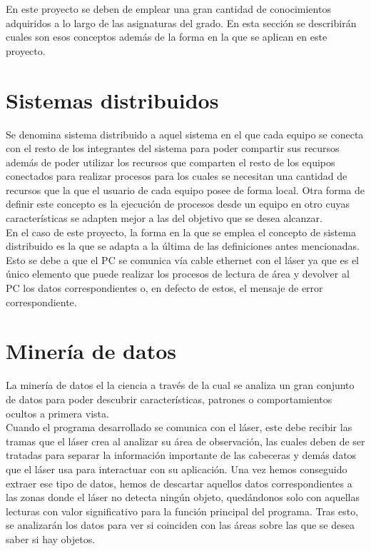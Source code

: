 
En este proyecto se deben de emplear una gran cantidad de  conocimientos adquiridos a lo largo de las asignaturas del grado. En esta sección se describirán cuales son esos conceptos además de la forma en la que se aplican en este proyecto.

\section{Sistemas distribuidos}

Se denomina sistema distribuido a aquel sistema en el que cada equipo se conecta con el resto de los integrantes del sistema para poder compartir sus recursos además de poder utilizar los recursos que comparten el resto de los equipos conectados para realizar procesos para los cuales se necesitan una cantidad de recursos que la que el usuario de cada equipo posee de forma local. Otra forma de definir este concepto es la ejecución de procesos desde un equipo en otro cuyas características se adapten mejor a las del objetivo que se desea alcanzar.\\
En el caso de este proyecto, la forma en la que se emplea el concepto de sistema distribuido es la que se adapta a la última de las definiciones antes mencionadas. Esto se debe a que el PC se comunica vía cable ethernet con el láser ya que es el único elemento que puede realizar los procesos de lectura de área y devolver al PC los datos correspondientes o, en defecto de estos, el mensaje de error correspondiente.

\section{Minería de datos}

La minería de datos el la ciencia a través de la cual se analiza un gran conjunto de datos para poder descubrir características, patrones o comportamientos ocultos a primera vista.\\
Cuando el programa desarrollado se comunica con el láser, este debe recibir las tramas que el láser crea al analizar su área de observación, las cuales deben de ser tratadas para separar la información importante de las cabeceras y demás datos que el láser usa para interactuar con su aplicación. Una vez hemos conseguido extraer ese tipo de datos, hemos de descartar aquellos datos correspondientes a las zonas donde el láser no detecta ningún objeto, quedándonos solo con aquellas lecturas con valor significativo para la función principal del programa. Tras esto, se analizarán los datos para ver si coinciden con las áreas sobre las que se desea saber si hay objetos.

